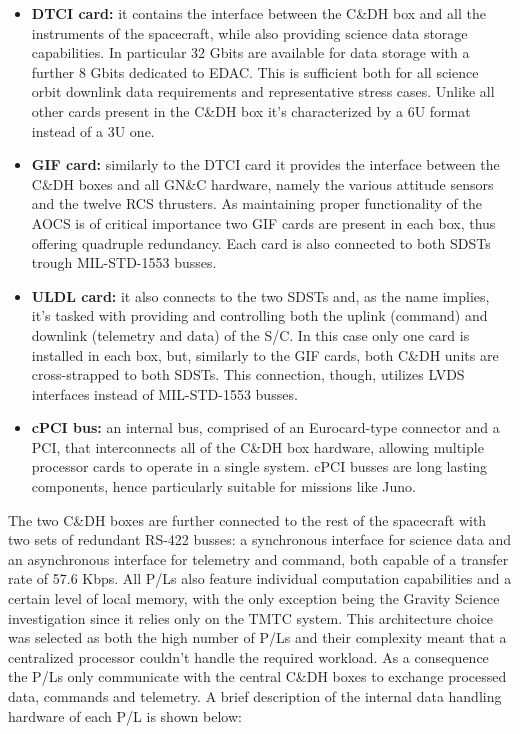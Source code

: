 \begin{itemize}
    \item \textbf{DTCI card:} it contains the interface between the C\&DH box and all the instruments of the spacecraft, while also providing science data storage capabilities. In particular 32 Gbits are available for data storage with a further 8 Gbits dedicated to EDAC. This is sufficient both for all science orbit downlink data requirements and representative stress cases. Unlike all other cards present in the C\&DH box it's characterized by a 6U format instead of a 3U one. \cite{juno_sito}
    \item \textbf{GIF card:} similarly to the DTCI card it provides the interface between the C\&DH boxes and all GN\&C hardware, namely the various attitude sensors and the twelve RCS thrusters. As maintaining proper functionality of the AOCS is of critical importance two GIF cards are present in each box, thus offering quadruple redundancy. Each card is also connected to both SDSTs trough MIL-STD-1553 \cite{MIL-STD-1553} busses. \cite{juno_telecommunication}   
    \item \textbf{ULDL card:} it also connects to the two SDSTs and, as the name implies, it's tasked with providing and controlling both the uplink (command) and downlink (telemetry and data) of the S/C. In this case only one card is installed in each box, but, similarly to the GIF cards, both C\&DH units are cross-strapped to both SDSTs. This connection, though, utilizes LVDS interfaces instead of MIL-STD-1553 busses. \cite{juno_telecommunication}  
    \item \textbf{cPCI bus:} an internal bus, comprised of an Eurocard-type connector and a PCI, that interconnects all of the C\&DH box hardware, allowing multiple processor cards to operate in a single system. cPCI busses are long lasting components, hence particularly suitable for missions like Juno.
    

\end{itemize}
The two C\&DH boxes are further connected to the rest of the spacecraft with two sets of redundant RS-422 busses: a synchronous interface for science data  and an asynchronous interface for telemetry and command, both capable of a transfer rate of 57.6 Kbps. \cite{UVS_info} \cite{MWR_info} 
All P/Ls also feature individual computation capabilities and a certain level of local memory, with the only exception being the Gravity Science investigation since it relies only on the TMTC system. This architecture choice was selected as both the high number of P/Ls and their complexity meant that a centralized processor couldn't handle the required workload. As a consequence the P/Ls only communicate with the central C\&DH boxes to exchange processed data, commands and telemetry. A brief description of the internal data handling hardware of each P/L is shown below:
